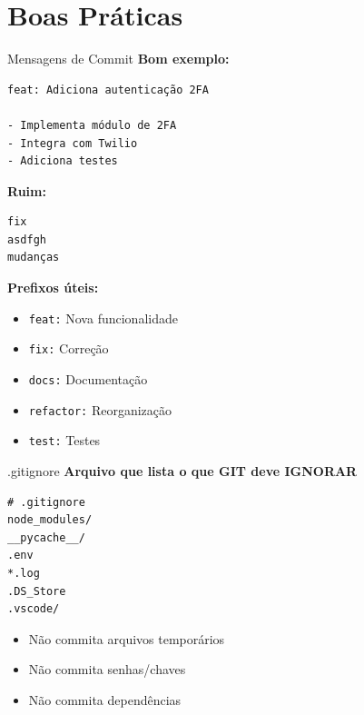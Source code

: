 \documentclass[11pt]{beamer}
\begin{document}
\section{Boas Práticas}

\begin{frame}{Mensagens de Commit}
\textbf{Bom exemplo:}
\begin{lstlisting}
feat: Adiciona autenticação 2FA

- Implementa módulo de 2FA
- Integra com Twilio
- Adiciona testes
\end{lstlisting}

\vspace{0.5cm}

\textbf{Ruim:}
\begin{lstlisting}
fix
asdfgh
mudanças
\end{lstlisting}

\vspace{0.5cm}

\textbf{Prefixos úteis:}
\begin{itemize}
    \small
    \item \texttt{feat:} Nova funcionalidade
    \item \texttt{fix:} Correção
    \item \texttt{docs:} Documentação
    \item \texttt{refactor:} Reorganização
    \item \texttt{test:} Testes
\end{itemize}
\end{frame}

\begin{frame}{.gitignore}
\textbf{Arquivo que lista o que GIT deve IGNORAR}

\begin{lstlisting}
# .gitignore
node_modules/
__pycache__/
.env
*.log
.DS_Store
.vscode/
\end{lstlisting}

\begin{itemize}
    \item Não commita arquivos temporários
    \item Não commita senhas/chaves
    \item Não commita dependências
\end{itemize}
\end{frame}
\end{document}
